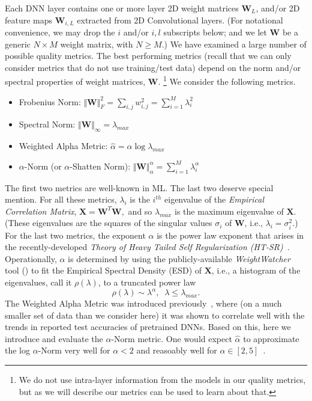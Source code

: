 Each DNN layer contains one or more layer 2D weight matrices $\mathbf{W}_{L}$, and/or 2D feature maps $\mathbf{W}_{i,L}$ extracted from 2D Convolutional layers. 
(For notational convenience, we may drop the $i$ and/or $i,l$ subscripts below; and we let $\mathbf{W}$ be a generic $N\times M$ weight matrix, with $N\ge M$.) 
%
We have examined a large number of possible quality metrics.
The best performing metrics (recall that we can only consider metrics that do not use training/test data) depend on the norm and/or spectral properties of weight matrices, $\mathbf{W}$.%
\footnote{We do not use intra-layer information from the models in our quality metrics, but as we will describe our metrics can be used to learn about that.}
We consider the following metrics.
\begin{itemize}
\item 
Frobenius Norm: $\Vert\mathbf{W}\Vert^{2}_{F}=\sum_{i,j}w^{2}_{i,j} = \sum_{i=1}^{M} \lambda_{i}^{2}$
\item 
Spectral Norm: $\Vert\mathbf{W}\Vert_{\infty}=\lambda_{max}$
\item 
Weighted Alpha Metric: $\hat{\alpha}=\alpha\log\lambda_{max}$
\item 
$\alpha$-Norm (or $\alpha$-Shatten Norm): $\Vert\mathbf{W}\Vert^{\alpha}_{\alpha}=\sum_{i=1}^{M}\lambda_{i}^{\alpha}$
\end{itemize}
The first two metrics are well-known in ML.
The last two deserve special mention.
For all these metrics, $\lambda_{i}$ is the $i^{th}$ eigenvalue of the \emph{Empirical Correlation Matrix},
$ %
\mathbf{X}=\mathbf{W}^{T}\mathbf{W} ,
$ %
and so $\lambda_{max}$ is the maximum eigenvalue of $\mathbf{X}$. 
(These eigenvalues are the squares of the singular values $\sigma_{i}$ of $\mathbf{W}$, i.e., $\lambda_{i}=\sigma^{2}_{i}$.)
For the last two metrics, the exponent $\alpha$ is the power law exponent that arises in the recently-developed \emph{Theory of Heavy Tailed Self Regularization (HT-SR)}~\cite{MM18_TR, MM19_HTSR_ICML, MM20_SDM}.
Operationally, $\alpha$ is determined by using the publicly-available \emph{WeightWatcher} tool (\cite{weightwatcher_package}) to fit the Empirical Spectral Density (ESD) of $\mathbf{X}$, i.e., a histogram of the eigenvalues, call it $\rho(\lambda)$, to a truncated power law
\begin{equation}
\rho(\lambda)\sim\lambda^{\alpha},\;\;\lambda\le\lambda_{max}  .
\end{equation}
The Weighted Alpha Metric was introduced previously~\cite{MM20_SDM}, where (on a much smaller set of data than we consider here) it was shown to correlate well with the trends in reported test accuracies of pretrained DNNs.
Based on this, here we introduce and evaluate the $\alpha$-Norm metric.
One would expect $\hat{\alpha}$ to approximate the log $\alpha$-Norm very well for $\alpha < 2$ and reasoably well for $\alpha\in[2,5]$~\cite{MM20_unpub_work}.

